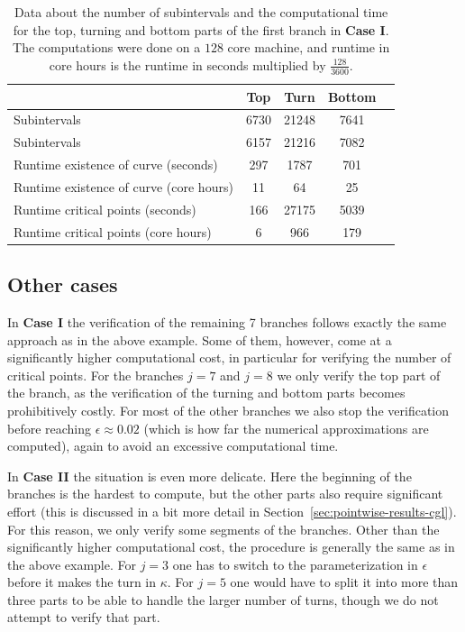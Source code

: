 \documentclass[11pt]{article}
\begin{document}
\begin{table}[ht]
  \centering
  \begin{tabular}{lcccc}
    \toprule
    & Top & Turn & Bottom\\
    \midrule
    Subintervals & 6730 & 21248 & 7641\\
    Subintervals & 6157 & 21216 & 7082\\
    Runtime existence of curve (seconds) & 297 & 1787 & 701\\
    Runtime existence of curve (core hours) & 11 & 64 & 25\\
    Runtime critical points (seconds) & 166 & 27175 & 5039\\
    Runtime critical points (core hours) & 6 & 966 & 179\\
    \bottomrule
  \end{tabular}
  \caption{Data about the number of subintervals and the computational
    time for the top, turning and bottom parts of the first branch in
    \textbf{Case I}. The computations were done on a \(128\) core
    machine, and runtime in core hours is the runtime in seconds
    multiplied by \(\frac{128}{3600}\).}
  \label{table:CGL-example}
\end{table}

\subsection{Other cases}
\label{sec:other-cases-cgl}
In \textbf{Case I} the verification of the remaining 7 branches
follows exactly the same approach as in the above example. Some of
them, however, come at a significantly higher computational cost, in
particular for verifying the number of critical points. For the
branches \(j = 7\) and \(j = 8\) we only verify the top part of the
branch, as the verification of the turning and bottom parts becomes
prohibitively costly. For most of the other branches we also stop the
verification before reaching \(\epsilon \approx 0.02\) (which is how
far the numerical approximations are computed), again to avoid an
excessive computational time.

In \textbf{Case II} the situation is even more delicate. Here the
beginning of the branches is the hardest to compute, but the
other parts also require significant effort (this is discussed in a
bit more detail in Section~\ref{sec:pointwise-results-cgl}). For this
reason, we only verify some segments of the branches. Other than the
significantly higher computational cost, the procedure is generally
the same as in the above example. For \(j = 3\) one has to switch to
the parameterization in \(\epsilon\) before it makes the turn in
\(\kappa\). For \(j = 5\) one would have to split it into more than
three parts to be able to handle the larger number of turns, though we
do not attempt to verify that part.
\end{document}
